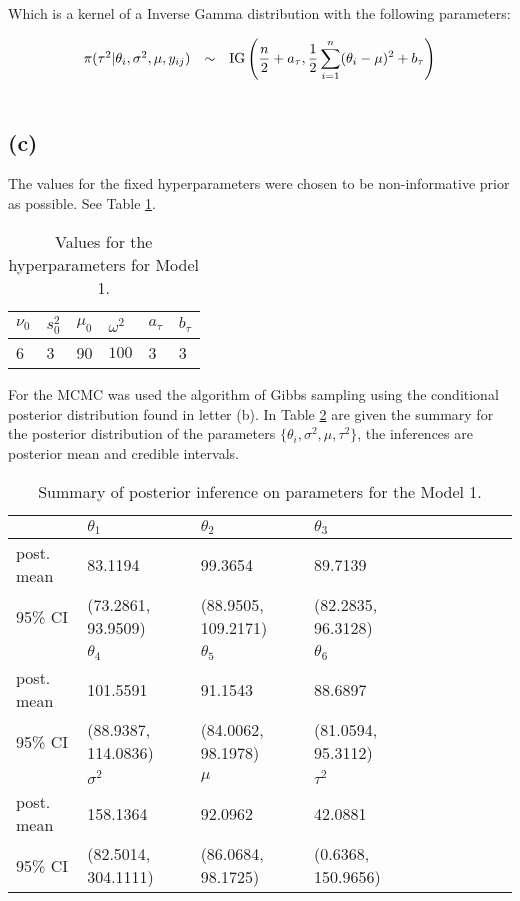 \documentclass[a4paper, 11pt]{article}
\begin{document}
Which is a kernel of a Inverse Gamma distribution with the following parameters:

\begin{equation*}
\begin{array}{lcl ll }

\pi(\tau^2| \theta_i, \sigma^2, \mu, y_{ij}) & \sim &  \mbox{IG} \left( \dfrac{n}{2}+a_\tau , \dfrac{1}{2}
\displaystyle\sum_{i=1}^{n} (\theta_i - \mu)^2 + b_\tau \right)  \\\\

 \end{array}
\end{equation*}

\subsection*{(c)}

The values for the fixed hyperparameters were chosen to be non-informative prior as possible. See Table \ref{tab1}.

\begin{table}[H]
\centering

\begin{tabular}{llllll}
\hline	
$\nu_0$  & $s_0^2$ & $\mu_0$ & $\omega^2$ & $a_\tau$ & $b_\tau$ \\
\hline
6      & 3    & 90      & $100$     & 3       & 3       \\    
\hline
\end{tabular}
\caption{Values for the hyperparameters for Model 1.}
\label{tab1}
\end{table}

For the MCMC was used the algorithm of Gibbs sampling using the conditional posterior distribution found in letter (b). In Table \ref{tab2} are given the summary for the posterior distribution of the parameters $\{ \theta_i, \sigma^2, \mu, \tau^2\}$, the inferences are posterior mean and credible intervals.

\begin{table}[H]
\centering
\begin{tabular}{llllllllll}
\hline
& $\theta_1$ & $\theta_2$ & $\theta_3$  \\
\hline
post. mean & 83.1194  & 99.3654  &  89.7139     \\
95\% CI & (73.2861, 93.9509) &  (88.9505, 109.2171) & (82.2835, 96.3128)\\ 
\hline
& $\theta_4$ & $\theta_5$ &  $\theta_6$ \\
\hline
post. mean  & 101.5591 & 91.1543 &  88.6897 \\
95\% CI & (88.9387, 114.0836)  & (84.0062, 98.1978) & (81.0594, 95.3112) \\ 
\hline
& $\sigma^2$ & $\mu$      & $\tau^2$ \\
\hline
post. mean & 158.1364   & 92.0962   & 42.0881     \\  
95\% CI & (82.5014, 304.1111) & (86.0684, 98.1725) &  (0.6368, 150.9656) & \\
\hline
\end{tabular}
\caption{Summary of posterior inference on parameters for the Model 1.}
\label{tab2}
\end{table}
\end{document}
